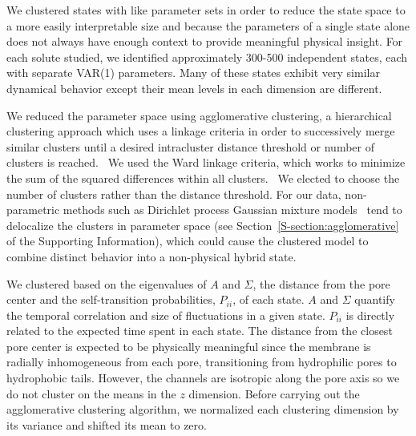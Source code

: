 \documentclass[journal=jpcbfk,manuscript=article]{achemso}
\begin{document}
  We clustered states with like parameter sets in order to reduce the state space to
  a more easily interpretable size 
  and because the parameters of a single state alone does not always have enough context
  to provide meaningful physical insight. For each solute studied, we identified 
  approximately 300-500 independent states, each with separate VAR(1) parameters.
  Many of these states exhibit very similar dynamical behavior except their mean 
  levels in each dimension are different.
  
  We reduced the parameter space using agglomerative clustering, a hierarchical
  clustering approach which uses a linkage criteria in order to successively merge
  similar clusters until a desired intracluster distance threshold or number of
  clusters is reached.~\cite{pedregosa_scikit-learn_2011} We used the Ward linkage 
  criteria, which works to minimize the sum of the squared differences within all
  clusters.~\cite{ward_hierarchical_1963} We elected to choose the number of clusters
  rather than the distance threshold. For our data, non-parametric methods such as 
  Dirichlet process Gaussian mixture models~\cite{pedregosa_scikit-learn_2011,gelman_bayesian_2013}
  tend to delocalize the clusters in parameter space (see Section~\ref{S-section:agglomerative}
  of the Supporting Information), which could cause the clustered model to combine 
  distinct behavior into a non-physical hybrid state.

  We clustered based on the eigenvalues of $A$ and $\Sigma$, the distance from the 
  pore center and the self-transition probabilities, $P_{ii}$, of each state. $A$ 
  and $\Sigma$ quantify the temporal correlation and size of fluctuations in a 
  given state. $P_{ii}$ is directly related to the expected time spent in each state.
  The distance from the closest pore center is expected to be physically meaningful
  since the membrane is radially inhomogeneous from each pore, transitioning from 
  hydrophilic pores to hydrophobic tails. However, the channels are isotropic along
  the pore axis so we do not cluster on the means in the $z$ dimension. Before carrying
  out the agglomerative clustering algorithm, we normalized each clustering dimension
  by its variance and shifted its mean to zero.
  
\end{document}
